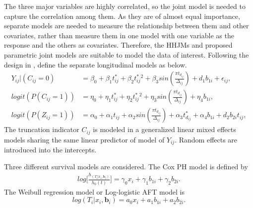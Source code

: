 The three major variables are highly correlated, so the joint model is needed to capture the correlation among them. As they are of almost equal importance, separate models are needed to measure the relationship between them and other covariates, rather than measure them in one model with one variable as the response and the others as covariates. Therefore, the HHJMs and proposed parametric joint models are suitable to model the data of interest.
Following the design in \cite{yu2018joint}, define the separate longitudinal models as below. 
\begin{equation}
    \begin{split}
        Y_{ij}|(C_{ij} = 0) &=  \beta_0 + \beta_1 t_{ij}^{\ast} + \beta_2  t_{ij}^{\ast}^2 + \beta_3 sin(\frac{\pi t_{d_{ij}}}{\Delta_{ij}}) + d_1 b_{1i} + \epsilon_{ij}, \\
        logit(P(C_{ij} = 1)) &=  \eta_0 + \eta_1 t_{ij}^{\ast} + \eta_2  t_{ij}^{\ast}^2 + \eta_3 sin(\frac{\pi t_{d_{ij}}}{\Delta_{ij}}) + \eta_4 b_{1i},  \\
        logit(P(Z_{ij} = 1)) &= \alpha_0 + \alpha_1 t_{ij} + \alpha_2 sin(\frac{\pi t_{d_{ij}}}{\Delta_{ij}}) + \alpha_3 t_{d_{ij}}^{\ast} + \alpha_4 b_{1i} + d_2 b_{2i} t_{ij},
    \end{split}
    \label{eq:y}
\end{equation}
The truncation indicator $C_{ij}$ is modeled in a generalized linear mixed effects models sharing the same linear predictor of model of $Y_{ij}$. Random effects are introduced into the intercepts.

Three different survival models are considered. The Cox PH model is defined by
\begin{equation}
    \begin{split}
        log\Big[ \frac{h_(T_i|x_i,\boldsymbol{b}_i)}{h_0(t)}\Big] = \gamma_0 x_i + \gamma_1 b_{1i} + \gamma_2 b_{2i}.
    \end{split}
\end{equation}
The Weibull regression model or Log-logistic AFT model is
\begin{equation}
    log(T_i|x_i,\boldsymbol{b}_i) = a_0 x_i + a_1 b_{1i} + a_2 b_{2i}.
\end{equation}




